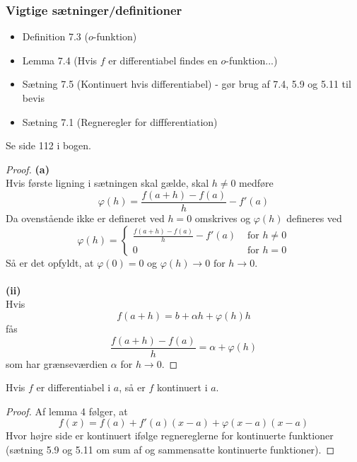 \subsubsection{Vigtige sætninger/definitioner}
\begin{itemize}
\setlength\itemsep{0em}
\item Definition 7.3 ($o$-funktion)
\item Lemma 7.4 (Hvis $f$ er differentiabel findes en $o$-funktion...)
\item Sætning 7.5 (Kontinuert hvis differentiabel) - gør brug af 7.4, 5.9 og 5.11 til bevis
\item Sætning 7.1 (Regneregler for diffferentiation)
\end{itemize}
\clearpage
\begin{theorem}
Se side 112 i bogen.
\end{theorem}
\begin{proof}
\textbf{(a)}\\
Hvis første ligning i sætningen skal gælde, skal $h\neq 0$ medføre
\begin{equation}
\varphi (h)=\frac{f(a+h)-f(a)}{h}-f'(a)
\end{equation}
Da ovenstående ikke er defineret ved $h=0$ omskrives og $\varphi (h)$ defineres ved 
\begin{equation}
\varphi (h)=\begin{cases}
\frac{f(a+h)-f(a)}{h}-f'(a)&\text{ for } h\neq 0\\
0&\text{ for } h=0
\end{cases}
\end{equation}
Så er det opfyldt, at $\varphi (0)=0$ og $\varphi (h)\to 0\text{ for }h\to 0$.\\\\
\textbf{(ii)}\\
Hvis 
\begin{equation}
f(a+h)=b+\alpha h+\varphi (h)h
\end{equation}
fås
\begin{equation}
\frac{f(a+h)-f(a)}{h}=\alpha+\varphi (h)
\end{equation}
som har grænseværdien $\alpha$ for $h\to 0$.
\end{proof}
\begin{theorem}
Hvis $f$ er differentiabel i $a$, så er $f$ kontinuert i $a$.
\end{theorem}
\begin{proof}
Af lemma 4 følger, at
\begin{equation}
f(x)=f(a)+f'(a)(x-a)+\varphi (x-a)(x-a)
\end{equation}
Hvor højre side er kontinuert ifølge regnereglerne for kontinuerte funktioner (sætning 5.9 og 5.11 om sum af og sammensatte kontinuerte funktioner).
\end{proof}
\clearpage
